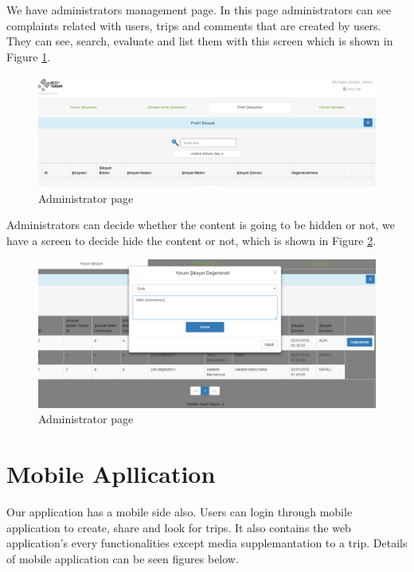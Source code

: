 \newpage

We have administrators management page. In this page administrators can see complaints related with users, trips and comments that are created by users. They can see, search, evaluate and list them with this screen which is shown in Figure \ref{fig:admin1}.
\begin{figure}[!htbp]
\centering
\includegraphics[width=\textwidth]{projectChapters/images/admin1.png}
\caption{Administrator page}
\label{fig:admin1}
\end{figure}

\newpage

Administrators can decide whether the content is going to be hidden or not, we have a screen to decide hide the content or not, which is shown in Figure  \ref{fig:admin2}.

\begin{figure}[!htbp]
\centering
\includegraphics[width=\textwidth]{projectChapters/images/admin2.png}
\caption{Administrator page}
\label{fig:admin2}
\end{figure}

\newpage


\section{Mobile Apllication}

Our application has a mobile side also. Users can login through mobile application to create, share and look for trips. It also contains the web application's every functionalities except media supplemantation to a trip. Details of mobile application can be seen figures below.

